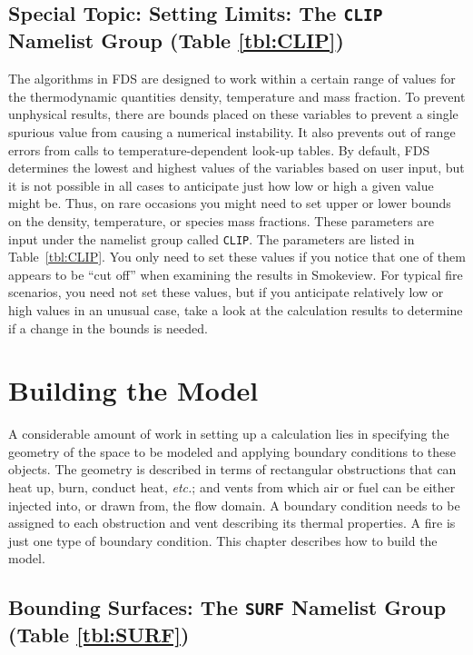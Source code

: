 \documentclass[11pt]{book}
\newcommand{\ct}{\tt\small}
\begin{document}
\section{Special Topic: Setting Limits: The \texorpdfstring{{\tt CLIP}}{CLIP} Namelist Group (Table \ref{tbl:CLIP})}
\label{info:CLIP}

The algorithms in FDS are designed to work within a certain range of values for the thermodynamic quantities density, temperature and mass fraction. To prevent unphysical results,
there are bounds placed on these variables to prevent a single spurious value from causing a numerical instability. It also prevents out of range
errors from calls to temperature-dependent look-up tables. By default, FDS determines the lowest and highest values of the variables based on user input, but it is not
possible in all cases to anticipate just how low or high a given value might be. Thus,
on rare occasions you might need to set upper or lower bounds on the density, temperature, or species mass fractions. These parameters are input under the
namelist group called {\ct CLIP}. The parameters are listed in Table~\ref{tbl:CLIP}. You only need to set these values if you notice that one of them appears to be
``cut off'' when examining the results in Smokeview. For typical fire scenarios, you need not set these values, but if you anticipate relatively low or high values in an
unusual case, take a look at the calculation results to determine if a change in the bounds is needed.








\chapter{Building the Model}

A considerable amount of work in setting up a calculation lies in specifying the
geometry of the space to be modeled and applying boundary conditions
to these objects. The geometry is described in terms
of rectangular obstructions that can heat up, burn, conduct heat, {\em etc.};
and vents from which air or fuel can be
either injected into, or drawn from, the flow domain.
A boundary condition needs to be assigned to each obstruction
and vent describing its thermal properties. A fire is just one type of
boundary condition. This chapter describes how to build the model.


\section{Bounding Surfaces: The \texorpdfstring{{\tt SURF}}{SURF} Namelist Group (Table \ref{tbl:SURF})}
\label{info:SURF}
\end{document}
